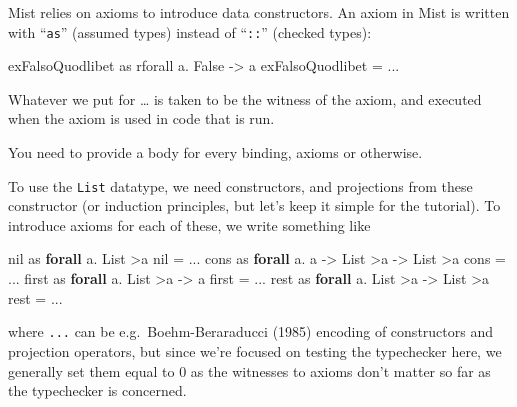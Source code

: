 \documentclass[
]{darts-v2021}
\newenvironment{Shaded}{}{}
\newcommand{\DataTypeTok}[1]{\textcolor[rgb]{0.56,0.13,0.00}{#1}}
\newcommand{\KeywordTok}[1]{\textcolor[rgb]{0.00,0.44,0.13}{\textbf{#1}}}
\newcommand{\NormalTok}[1]{#1}
\newcommand{\OperatorTok}[1]{\textcolor[rgb]{0.40,0.40,0.40}{#1}}
\newcommand{\OtherTok}[1]{\textcolor[rgb]{0.00,0.44,0.13}{#1}}
\renewenvironment{quote}{\begin{myquote}}{\end{myquote}}
\begin{document}
Mist relies on axioms to introduce data constructors. An axiom in Mist
is written with ``\texttt{as}'' (assumed types) instead of
``\texttt{::}'' (checked types):

\begin{Shaded}
\begin{Highlighting}[]
\NormalTok{exFalsoQuodlibet as rforall a}\OperatorTok{.} \DataTypeTok{False} \OtherTok{{-}\textgreater{}}\NormalTok{ a}
\NormalTok{exFalsoQuodlibet }\OtherTok{=} \OperatorTok{...}
\end{Highlighting}
\end{Shaded}

Whatever we put for \ldots{} is taken to be the witness of the axiom,
and executed when the axiom is used in code that is run.

\begin{quote}
You need to provide a body for every binding, axioms or otherwise.
\end{quote}

To use the \texttt{List} datatype, we need constructors, and projections
from these constructor (or induction principles, but let's keep it
simple for the tutorial). To introduce axioms for each of these, we
write something like

\begin{Shaded}
\begin{Highlighting}[]
\NormalTok{nil as }\KeywordTok{forall}\NormalTok{ a}\OperatorTok{.} \DataTypeTok{List} \OperatorTok{\textgreater{}}\NormalTok{a}
\NormalTok{nil }\OtherTok{=} \OperatorTok{...}
\NormalTok{cons as }\KeywordTok{forall}\NormalTok{ a}\OperatorTok{.}\NormalTok{ a }\OtherTok{{-}\textgreater{}} \DataTypeTok{List} \OperatorTok{\textgreater{}}\NormalTok{a }\OtherTok{{-}\textgreater{}} \DataTypeTok{List} \OperatorTok{\textgreater{}}\NormalTok{a}
\NormalTok{cons }\OtherTok{=} \OperatorTok{...}
\NormalTok{first as }\KeywordTok{forall}\NormalTok{ a}\OperatorTok{.} \DataTypeTok{List} \OperatorTok{\textgreater{}}\NormalTok{a }\OtherTok{{-}\textgreater{}}\NormalTok{ a}
\NormalTok{first }\OtherTok{=} \OperatorTok{...}
\NormalTok{rest as }\KeywordTok{forall}\NormalTok{ a}\OperatorTok{.} \DataTypeTok{List} \OperatorTok{\textgreater{}}\NormalTok{a }\OtherTok{{-}\textgreater{}} \DataTypeTok{List} \OperatorTok{\textgreater{}}\NormalTok{a}
\NormalTok{rest }\OtherTok{=} \OperatorTok{...}
\end{Highlighting}
\end{Shaded}

where \texttt{...} can be e.g.~Boehm-Beraraducci (1985) encoding of
constructors and projection operators, but since we're focused on
testing the typechecker here, we generally set them equal to 0 as the
witnesses to axioms don't matter so far as the typechecker is concerned.
\end{document}
